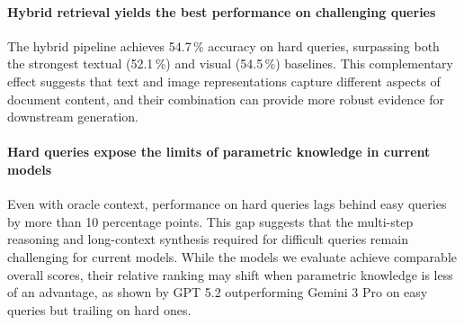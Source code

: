 

\paragraph{Hybrid retrieval yields the best performance on challenging queries} The hybrid pipeline achieves 54.7\,\% accuracy on hard queries, surpassing both the strongest textual (52.1\,\%) and visual (54.5\,\%) baselines. This complementary effect suggests that text and image representations capture different aspects of document content, and their combination can provide more robust evidence for downstream generation. %

\paragraph{Hard queries expose the limits of parametric knowledge in current models} Even with oracle context, performance on hard queries lags behind easy queries by more than 10 percentage points. This gap suggests that the multi-step reasoning and long-context synthesis required for difficult queries remain challenging for current models. While the models we evaluate achieve comparable overall scores, their relative ranking may shift when parametric knowledge is less of an advantage, as shown by GPT 5.2 outperforming Gemini 3 Pro on easy queries but trailing on hard ones.

